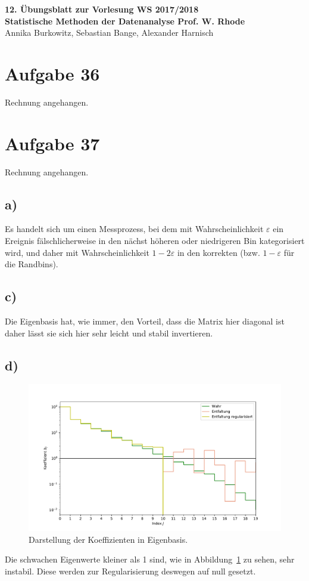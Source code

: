 \documentclass[a4paper, 11pt]{article}
\begin{document}
\noindent
\large{\textbf{12. Übungsblatt zur Vorlesung \hfill WS 2017/2018 \\
Statistische Methoden der Datenanalyse \hfill Prof. W. Rhode}} \\
Annika Burkowitz, Sebastian Bange, Alexander Harnisch \\
\noindent\makebox[\linewidth]{\rule{\textwidth}{0.4pt}}

\section*{Aufgabe 36}
Rechnung angehangen.


\section*{Aufgabe 37}
Rechnung angehangen.
\subsection*{a)}
Es handelt sich um einen Messprozess, bei dem mit Wahrscheinlichkeit $\varepsilon$ ein Ereignis fälschlicherweise in den nächst höheren oder niedrigeren Bin kategorisiert wird, und daher mit Wahrscheinlichkeit $1 - 2\varepsilon$ in den korrekten (bzw. $1 - \varepsilon$ für die Randbins).
\subsection*{c)}
Die Eigenbasis hat, wie immer, den Vorteil, dass die Matrix hier diagonal ist daher lässt sie sich hier sehr leicht und stabil invertieren.
\subsection*{d)}
\begin{figure}
    \centering
    \includegraphics[width=\textwidth]{../A37/Eigenbasis.pdf}
    \caption{Darstellung der Koeffizienten in Eigenbasis.}
    \label{fig:eigenbasis}
\end{figure}
Die schwachen Eigenwerte kleiner als 1 sind, wie in Abbildung~\ref{fig:eigenbasis} zu sehen, sehr instabil. Diese werden zur Regularisierung deswegen auf null gesetzt.
\end{document}
